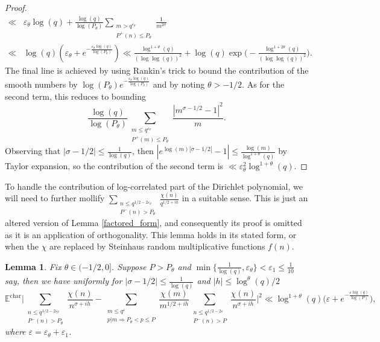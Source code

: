 \documentclass[10pt,a4paper]{amsart}
\newtheorem{lemma}{Lemma}
\numberwithin{equation}{section}
\begin{document}
\begin{proof}
\begin{align*}
        \ll& \varepsilon_\theta\log(q) + \frac{\log(q)}{\log(P_\theta)}\sum_{\substack{ m > q^{\varepsilon_\theta} \\ P^+(n) \leq P_\theta}}\frac{1}{m^{2\sigma}} \\ \ll& \log(q)(\varepsilon_\theta+e^{-\frac{\varepsilon_\theta\log(q)}{\log(P_\theta)}}) \ll \frac{\log^{1+\theta}(q)}{(\log\log(q))^2} + \log(q)\exp\big(-\frac{\log^{1+2\theta}(q)}{(\log\log(q))^2}\big).
    \end{align*}
    The final line is achieved by using Rankin's trick to bound the contribution of the smooth numbers by $\log(P_\theta)e^{-\frac{\varepsilon_\theta\log(q)}{\log(P_\theta)}}$ and by noting $\theta > -1/2$. As for the second term, this reduces to bounding
    $$\frac{\log(q)}{\log(P_\theta)}\sum_{\substack{m \leq q^{\varepsilon_\theta} \\ P^+(m) \leq P_\theta}}\frac{|m^{\sigma-1/2}-1|^2}{m}.$$
    Observing that $|\sigma-1/2| \leq \frac{1}{\log(q)}$, then $|e^{\log(m)|\sigma-1/2|}-1| \leq \frac{\log(m)}{\log^{1+\theta}(q)}$ by Taylor expansion, so the contribution of the second term is $\ll \varepsilon_\theta^2\log^{1+\theta}(q)$.
\end{proof}
To handle the contribution of log-correlated part of the Dirichlet polynomial, we will need to further mollify $\sum_{\substack{n \leq q^{1/2-2\varepsilon_\theta} \\ P^{-}(n) > P_\theta}}\frac{\chi(n)}{q^{1/2+ih}}$ in a suitable sense. This is just an altered version of Lemma \ref{factored_form}, and consequently its proof is omitted as it is an application of orthogonality. This lemma holds in its stated form, or when the $\chi$ are replaced by Steinhaus random multiplicative functions $f(n)$.
\begin{lemma}
    Fix $\theta \in (-1/2,0]$. Suppose $P > P_\theta$ and $\min\{\frac{1}{\log(q)},\varepsilon_\theta\} < \varepsilon_1 \leq \frac{1}{10}$ say, then we have uniformly for $|\sigma-1/2| \leq \frac{1}{\log(q)}$ and $|h| \leq \log^{\theta}(q)/2$
    \begin{equation*}
    \mathbb{E}^{\text{char}}\big|\sum_{\substack{n \leq q^{1/2-2\varepsilon_\theta} \\ P^{-}(n) >P_\theta}}\frac{\chi(n)}{n^{\sigma+ih}}-\sum_{\substack{m \leq q^{\varepsilon} \\ p|m \Rightarrow P_\theta < p \leq P}}\frac{\chi(m)}{m^{1/2+ih}}\sum_{\substack{n \leq q^{1/2-2\varepsilon} \\ P^{-}(n) > P}}\frac{\chi(n)}{n^{\sigma+ih}}\big|^2 \ll \log^{1+\theta}(q)\big(\varepsilon+e^{-\frac{\varepsilon\log(q)}{\log(P)}}\big),
    \end{equation*}
    where $\varepsilon = \varepsilon_\theta+\varepsilon_1$. \label{logcor_factored_form}
\end{lemma}
\end{document}
